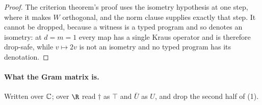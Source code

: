 \documentclass[acmsmall,screen,review,anonymous,nonacm]{acmart}
\begin{document}
\stmtUntyped
\begin{proof}
The criterion theorem's proof uses the isometry hypothesis at one step, where
it makes $W$ orthogonal, and the norm clause supplies exactly that step. It
cannot be dropped, because a witness is a typed program and so denotes an
isometry: at $d = m = 1$ every map has a single Kraus operator and is
therefore drop-safe, while $v \mapsto 2v$ is not an isometry and no typed
program has its denotation.
\end{proof}

\paragraph{What the Gram matrix is.} Written over $\mathbb{C}$; over $\R$ read
$\dagger$ as $\top$ and $\bar U$ as $U$, and drop the second half of (1).
\end{document}
